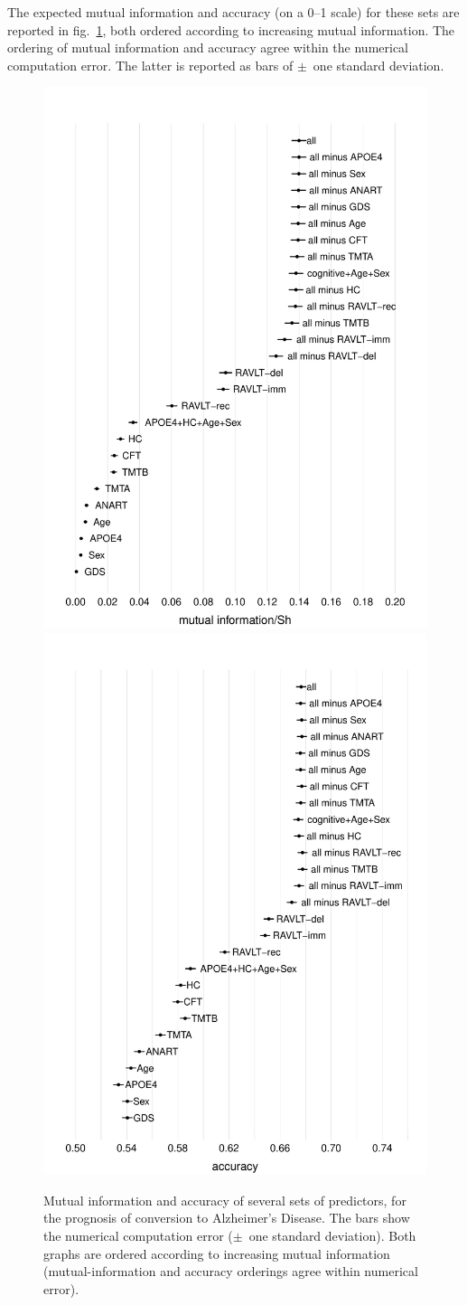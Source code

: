 \documentclass[utf8]{FrontiersinHarvard} %
\newcommand*{\fig}{fig.}%
\renewcommand*{\|}[1][]{\nonscript\:#1\vert\nonscript\:\mathopen{}}
\newcommand*{\ad}{Alzheimer's Disease}
\begin{document}
The expected mutual information and accuracy (on a 0--1 scale) for these sets are reported in \fig~\ref{fig:mutual_info}, both ordered according to increasing mutual information. The ordering of mutual information and accuracy agree within the numerical computation error. The latter is reported as bars of $\pm$~one standard deviation.
\begin{figure}[!t]%
  \centering%
  \includegraphics[width=0.494\linewidth]{plotMI.pdf}\hfill%
  \includegraphics[width=0.494\linewidth]{plotAcc.pdf}%
  \caption{Mutual information and accuracy of several sets of predictors, for the prognosis of conversion to \ad. The bars show the numerical computation error ($\pm$~one standard deviation). Both graphs are ordered according to increasing mutual information (mutual-information and accuracy orderings agree within numerical error).}\label{fig:mutual_info}
\end{figure}%
\end{document}

